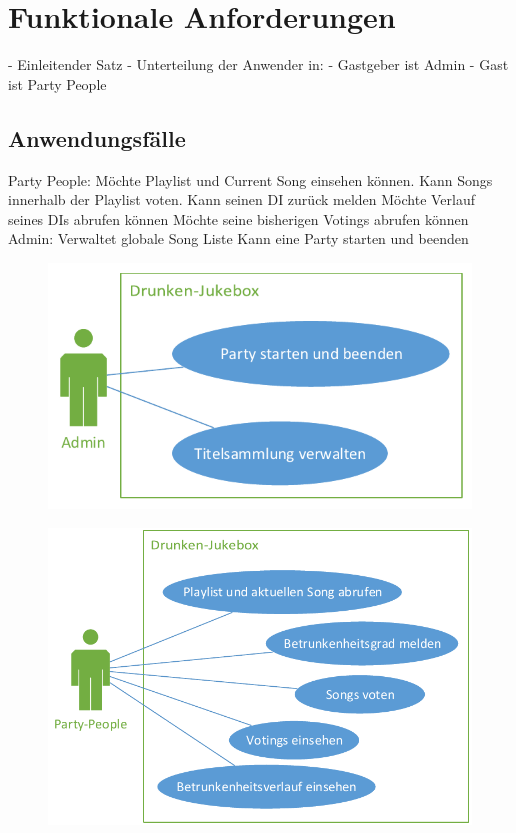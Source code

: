 \section{Funktionale Anforderungen}



- Einleitender Satz
- Unterteilung der Anwender in:
	- Gastgeber ist Admin
	- Gast ist Party People

\subsection{Anwendungsfälle}

Party People:
Möchte Playlist und Current Song einsehen können.
Kann Songs innerhalb der Playlist voten.
Kann seinen DI zurück melden
Möchte Verlauf seines DIs abrufen können
Möchte seine bisherigen Votings abrufen können
Admin:
Verwaltet globale Song Liste
Kann eine Party starten und beenden

\begin{figure}
\centering
\includegraphics[width=0.75\linewidth]{Bilder/AdminUseCase}
\caption{}
\label{fig:AdminUseCase}
\end{figure}

\begin{figure}
\centering
\includegraphics[width=0.95\linewidth]{Bilder/PartyPeopleUseCase}
\caption{}
\label{fig:PartyPeopleUseCase}
\end{figure}
